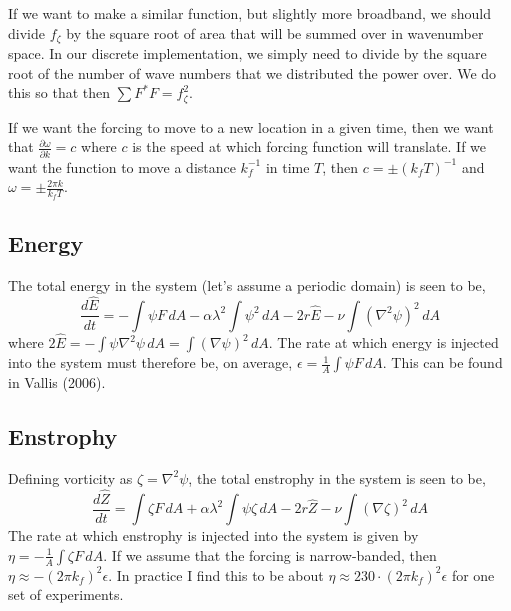 \documentclass[11pt]{article}
\begin{document}
If we want to make a similar function, but slightly more broadband, we should divide $f_\zeta$ by the square root of area that will be summed over in wavenumber space. In our discrete implementation, we simply need to divide by the square root of the number of wave numbers that we distributed the power over. We do this so that then $\sum F^\ast F = f_\zeta^2$.

If we want the forcing to move to a new location in a given time, then we want that $\frac{\partial \omega}{\partial k}=c$ where $c$ is the speed at which forcing function will translate. If we want the function to move a distance $k_f^{-1}$ in time $T$, then $c=\pm\left( k_f T \right)^{-1}$ and $\omega = \pm \frac{2\pi k}{k_f T }$.

%
\subsection{Energy}
%

The total energy in the system (let's assume a periodic domain) is seen to be,
\begin{equation}
\frac{d \hat{E}}{d t} = - \int \psi F \, dA - \alpha \lambda^2 \int \psi^2 \, dA - 2 r \hat{E} - \nu \int \left( \nabla^2 \psi \right)^2 \, dA
\end{equation}
where $2 \hat{E}= - \int \psi \nabla^2 \psi \, dA =  \int \left( \nabla \psi \right)^2 \, dA$. The rate at which energy is injected into the system must therefore be, on average, $\epsilon=\frac{1}{A} \int \psi F \, dA$. This can be found in Vallis (2006).

%
\subsection{Enstrophy}
%

Defining vorticity as $\zeta = \nabla^2 \psi$, the total enstrophy in the system is seen to be,
\begin{equation}
\frac{d \hat{Z}}{d t} = \int \zeta F \, dA + \alpha \lambda^2 \int \psi \zeta \, dA - 2 r \hat{Z} - \nu \int \left( \nabla \zeta \right)^2 \, dA
\end{equation}
The rate at which enstrophy is injected into the system is given by $\eta=-\frac{1}{A} \int \zeta F \, dA$. If we assume that the forcing is narrow-banded, then $\eta \approx - (2\pi k_f)^2 \epsilon$. In practice I find this to be about $\eta \approx 230 \cdot (2\pi k_f)^2 \epsilon$ for one set of experiments.
\end{document}
